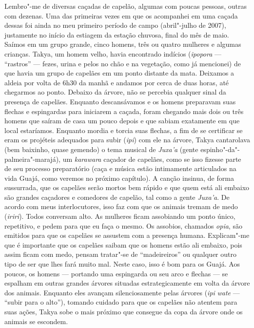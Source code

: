 Lembro"-me de diversas caçadas de capelão, algumas com poucas pessoas,
outras com dezenas. Uma das primeiras vezes em que os acompanhei em uma
caçada dessas foi ainda no meu primeiro período de campo (abril"-julho de
2007), justamente no início da estiagem da estação chuvosa, final do mês
de maio. Saímos em um grupo grande, cinco homens, três ou quatro
mulheres e algumas crianças. Takya, um homem velho, havia encontrado
indícios (\emph{ipopora} --- ``rastros'' --- fezes, urina e pelos no chão e na
vegetação, como já mencionei) de que havia um grupo de capelães em um
ponto distante da mata. Deixamos a aldeia por volta de 6h30 da manhã e
andamos por cerca de duas horas, até chegarmos ao ponto. Debaixo da
árvore, não se percebia qualquer sinal da presença de capelães. Enquanto
descansávamos e os homens preparavam suas flechas e espingardas para
iniciarem a caçada, foram chegando mais dois ou três homens que saíram
de casa um pouco depois e que sabiam exatamente em que local estaríamos.
Enquanto mordia e torcia suas flechas, a fim de se certificar se eram os
projéteis adequados para subir (\emph{ipi}) com ele na árvore, Takya
cantarolava (bem baixinho, quase gemendo) o tema musical de
\emph{Juxa'a} (gente espinho"-da"-palmeira"-marajá), um \emph{karawara}
caçador de capelães, como se isso fizesse parte de seu processo
preparatório (caça e música estão intimamente articulados na vida Guajá,
como veremos no próximo capítulo). A canção insinua, de forma
sussurrada, que os capelães serão mortos bem rápido e que quem está ali
embaixo são grandes caçadores e comedores de capelão, tal como a gente
\emph{Juxa'a}. De acordo com meus interlocutores, isso faz com que os
animais tremam de medo (\emph{iriri}). Todos conversam alto. As mulheres
ficam assobiando um ponto único, repetitivo, e pedem para que eu faça o
mesmo. Os assobios, chamados \emph{opia}, são emitidos para que os
capelães se assustem com a presença humana. Explicam"-me que é importante
que os capelães saibam que os homens estão ali embaixo, pois assim ficam
com medo, pensam tratar"-se de ``madeireiros'' ou qualquer outro tipo de
ser que lhes fará muito mal. Neste caso, isso é bom para os Guajá. Aos
poucos, os homens --- portando uma espingarda ou seu arco e flechas --- se
espalham em outras grandes árvores situadas estrategicamente em volta da
árvore dos animais. Enquanto eles avançam silenciosamente pelas árvores
(\emph{ipi} \emph{wate} --- ``subir para o alto''), tomando cuidado para que
os capelães não atentem para suas ações, Takya sobe o mais próximo que
consegue da copa da árvore onde os animais se escondem.


